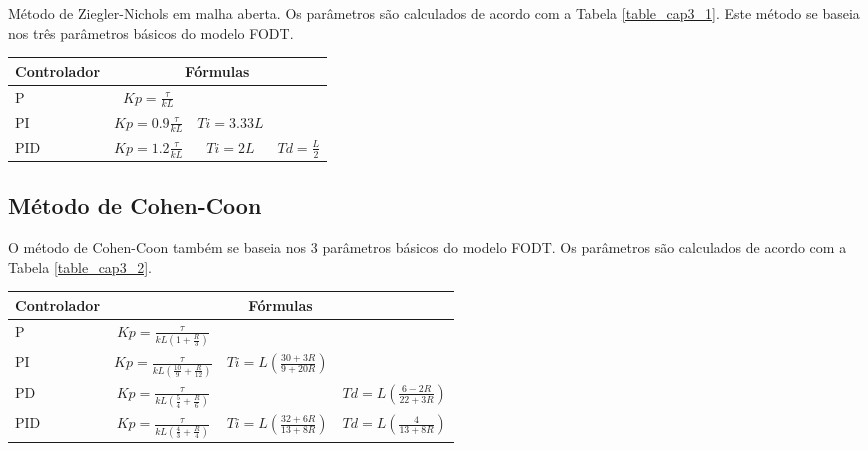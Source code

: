         Método de Ziegler-Nichols em malha aberta. Os parâmetros são calculados
        de acordo com a Tabela \ref{table_cap3_1}. Este método se baseia nos três parâmetros
        básicos do modelo \acs{FODT}.
       
        \newpage

        \begin{center}
            \begin{tabular}{l*{3}{c}}
            \label{table_cap3_1}
Controlador & \multicolumn{3}{c}{Fórmulas} \\
\hline
P   & $Kp = \frac{\tau}{kL}$     &              & \\
PI  & $Kp = 0.9 \frac{\tau}{kL}$ & $Ti = 3.33L$ & \\
PID & $Kp = 1.2 \frac{\tau}{kL}$ & $Ti = 2L$ & $Td = \frac{L}{2}$ \\
            \end{tabular}
        \end{center}
    
    \subsection{Método de Cohen-Coon}
        
        O método de Cohen-Coon também se baseia nos 3 parâmetros básicos
        do modelo \acs{FODT}. Os parâmetros são calculados de acordo com
        a Tabela \ref{table_cap3_2}.
        
        \begin{center}
            \begin{tabular}{l*{3}{c}}
	    \label{table_cap3_2}
Controlador & \multicolumn{3}{c}{Fórmulas} \\
\hline
P   & $Kp = \frac{\tau}{kL(1 + \frac{R}{3})}$             &              & \\
PI  & $Kp = \frac{\tau}{kL(\frac{10}{9} + \frac{R}{12})}$ & $Ti = L(\frac{30+3R}{9+20R})$ & \\
PD  & $Kp = \frac{\tau}{kL(\frac{5}{4} + \frac{R}{6})}$ & & $Td = L(\frac{6-2R}{22+3R})$ \\
PID & $Kp = \frac{\tau}{kL(\frac{4}{3} + \frac{R}{4})}$ & $Ti = L(\frac{32+6R}{13+8R})$ & $Td = L(\frac{4}{13+8R})$ \\
            \end{tabular}
        \end{center}
    
